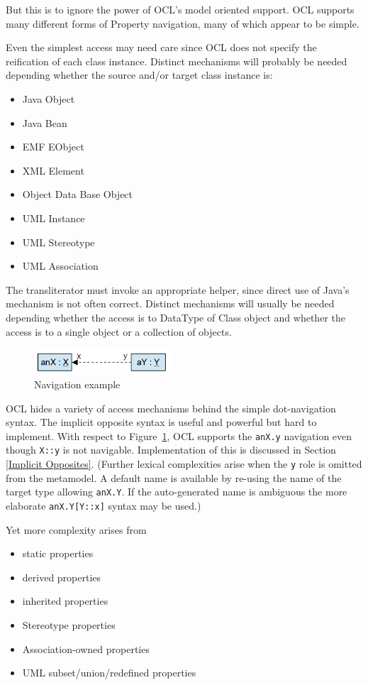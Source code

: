 \documentclass[sigconf]{acmart}
\begin{document}
But this is to ignore the power of OCL's model oriented support. OCL supports many different forms of Property navigation, many of which appear to be simple.

Even the simplest access may need care since OCL does not specify the reification of each class instance. Distinct mechanisms will probably be needed depending whether the source and/or target class instance is:
\begin{itemize}
	\item Java Object
	\item Java Bean
	\item EMF EObject
	\item XML Element
	\item Object Data Base Object
	\item UML Instance
	\item UML Stereotype
	\item UML Association
\end{itemize} 

The transliterator must invoke an appropriate helper, since direct use of Java's mechanism is not often correct. Distinct mechanisms will usually be needed depending whether the access is to DataType of Class object and whether the access is to a single object or a collection of objects.

\begin{figure}
	\includegraphics[width=2.0in]{OCLOpposite.png}
	\caption{Navigation example}
	\label{fig:navigation}
\end{figure}

OCL hides a variety of access mechanisms behind the simple dot-navigation syntax. The implicit opposite syntax is useful and powerful but hard to implement. With respect to Figure~\ref{fig:navigation}, OCL supports the \verb|anX.y| navigation even though \verb|X::y| is not navigable. Implementation of this is discussed in Section \ref{Implicit Opposites}.
(Further lexical complexities arise when the \verb|y| role is omitted from the metamodel. A default name is available by re-using the name of the target type allowing \verb|anX.Y|. If the auto-generated name is ambiguous the more elaborate \verb|anX.Y[Y::x]| syntax may be used.) 

Yet more complexity arises from

\begin{itemize}
	\item static properties
	\item derived properties
	\item inherited properties
	\item Stereotype  properties
	\item Association-owned properties
	\item UML subset/union/redefined properties
\end{itemize} 
\end{document}
